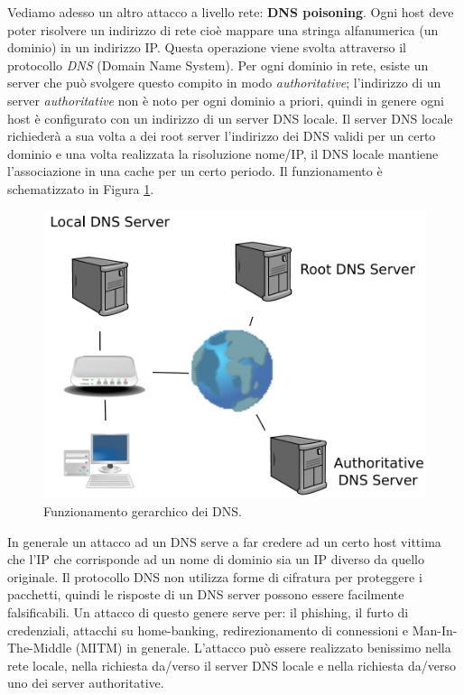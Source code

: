 Vediamo adesso un altro attacco a livello rete: \textbf{DNS poisoning}. Ogni host deve poter risolvere un indirizzo di rete cioè mappare una stringa alfanumerica (un dominio) in un indirizzo IP. Questa operazione viene svolta attraverso il protocollo \textit{DNS} (Domain Name System). Per ogni dominio in rete, esiste un server che può svolgere questo compito in modo \textit{authoritative}; l'indirizzo di un server \textit{authoritative} non è noto per ogni dominio a priori, quindi in genere ogni host è configurato con un indirizzo di un server DNS locale. Il server DNS locale richiederà a sua volta a dei root server l'indirizzo dei DNS validi per un certo dominio e una volta realizzata la risoluzione nome/IP, il DNS locale mantiene l'associazione in una cache per un certo periodo. Il funzionamento è schematizzato in Figura \ref{img:DNS}.
\begin{figure}[htbp]
	\centering
	\includegraphics[scale = 0.5]{images/DNS}
	\caption{Funzionamento gerarchico dei DNS.}
	\label{img:DNS}
\end{figure}
\noindent
In generale un attacco ad un DNS serve a far credere ad un certo host vittima che l'IP che corrisponde ad un nome di dominio sia un IP diverso da quello originale. Il protocollo DNS non utilizza forme di cifratura per proteggere i pacchetti, quindi le risposte di un DNS server possono essere facilmente falsificabili. Un attacco di questo genere serve per: il phishing, il furto di credenziali, attacchi su home-banking, redirezionamento di connessioni e Man-In-The-Middle (MITM) in generale. L'attacco può essere realizzato benissimo nella rete locale, nella richiesta da/verso il server DNS locale e nella richiesta da/verso uno dei server authoritative.\\
